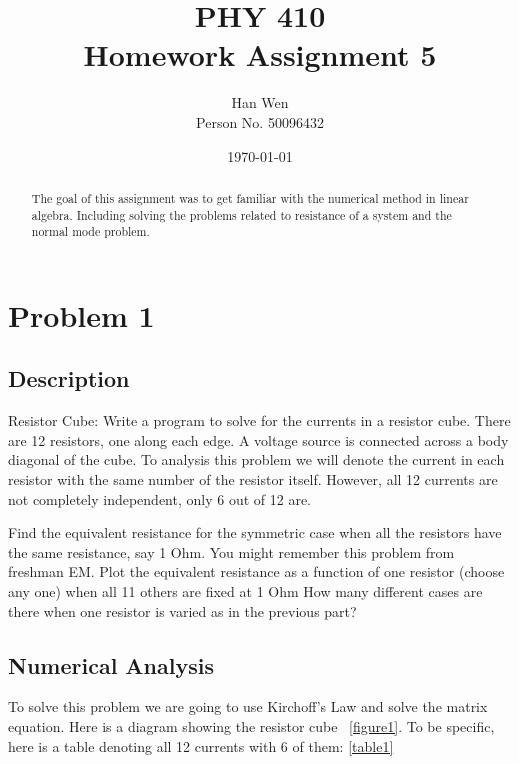 \documentclass[11pt,letterpaper]{article}
\begin{document}
\title{PHY 410 \\ Homework Assignment 5}
\author{Han Wen \\ \tiny Person No. 50096432}
\date{\today}

\maketitle

\begin{abstract}
The goal of this assignment was to get familiar with the numerical method in linear algebra. Including solving the problems related to resistance of a system and the normal mode problem. 


\end{abstract}

\tableofcontents

\newpage
\section{Problem 1}

\subsection{Description}
Resistor Cube: Write a program to solve for the currents in a resistor cube. There are 12 resistors, one along each edge. A voltage source is connected across a body diagonal of the cube. To analysis this problem we will denote the current in each resistor with the same number of the resistor itself. However, all 12 currents are not completely independent, only 6 out of 12 are. 

    Find the equivalent resistance for the symmetric case when all the resistors have the same resistance, say 1 Ohm. You might remember this problem from freshman EM.
    Plot the equivalent resistance as a function of one resistor (choose any one) when all 11 others are fixed at 1 Ohm
    How many different cases are there when one resistor is varied as in the previous part?





\subsection{Numerical Analysis}

To solve this problem we are going to use Kirchoff's Law and solve the matrix equation. Here is a diagram showing the resistor cube ~\ref{figure1}. 
To be specific, here is a table denoting all 12 currents with 6 of them: \ref{table1}
\end{document}
